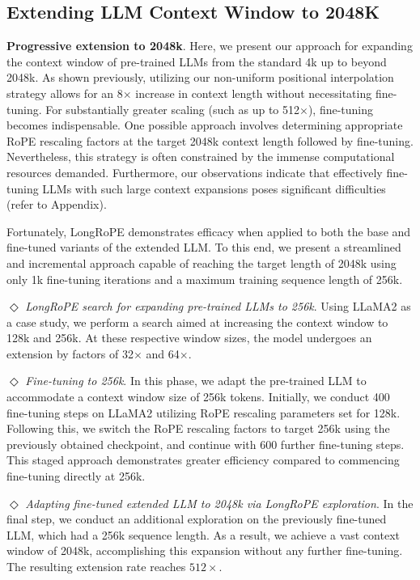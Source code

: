 \subsection{Extending LLM Context Window to 2048K}
\label{sec:extendto2048k}

\textbf{Progressive extension to 2048k}. Here, we present our approach for expanding the context window of pre-trained LLMs from the standard 4k up to beyond 2048k. As shown previously, utilizing our non-uniform positional interpolation strategy allows for an 8$\times$ increase in context length without necessitating fine-tuning. For substantially greater scaling (such as up to 512$\times$), fine-tuning becomes indispensable. One possible approach involves determining appropriate RoPE rescaling factors at the target 2048k context length followed by fine-tuning. Nevertheless, this strategy is often constrained by the immense computational resources demanded. Furthermore, our observations indicate that effectively fine-tuning LLMs with such large context expansions poses significant difficulties (refer to Appendix).

Fortunately, LongRoPE demonstrates efficacy when applied to both the base and fine-tuned variants of the extended LLM. To this end, we present a streamlined and incremental approach capable of reaching the target length of 2048k using only 1k fine-tuning iterations and a maximum training sequence length of 256k.

$\Diamond$ \textit{LongRoPE search for expanding pre-trained LLMs to 256k}. Using LLaMA2 as a case study, we perform a search aimed at increasing the context window to 128k and 256k. At these respective window sizes, the model undergoes an extension by factors of 32$\times$ and 64$\times$.

$\Diamond$ \textit{Fine-tuning to 256k}. In this phase, we adapt the pre-trained LLM to accommodate a context window size of 256k tokens. Initially, we conduct 400 fine-tuning steps on LLaMA2 utilizing RoPE rescaling parameters set for 128k. Following this, we switch the RoPE rescaling factors to target 256k using the previously obtained checkpoint, and continue with 600 further fine-tuning steps. This staged approach demonstrates greater efficiency compared to commencing fine-tuning directly at 256k.

$\Diamond$ \textit{Adapting fine-tuned extended LLM to 2048k via LongRoPE exploration}. In the final step, we conduct an additional exploration on the previously fine-tuned LLM, which had a 256k sequence length. As a result, we achieve a vast context window of 2048k, accomplishing this expansion without any further fine-tuning. The resulting extension rate reaches $512\times$.

